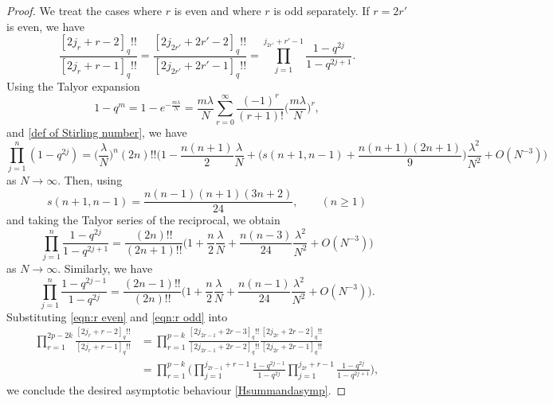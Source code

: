 \documentclass{amsart}
\theoremstyle{plain}
\theoremstyle{remark}
\numberwithin{equation}{section}
\begin{document}
\begin{proof}
   We treat the cases where \( r \) is even and where \( r \) is odd separately.
 If $r=2r'$ is even, we have
    \begin{equation*}
        \frac{[2j_{r}+r-2]_{q}!!}{[2j_{r}+r-1]_{q}!!}
        =\frac{[2j_{2r'}+2r'-2]_{q}!!}{[2j_{2r'}+2r'-1]_{q}!!}
        =\prod_{j=1}^{j_{2r'}+r'-1}\frac{1-q^{2j}}{1-q^{2j+1}}.
    \end{equation*}
    Using the Talyor expansion
    \begin{equation*}
        1-q^{m}=1-e^{-\frac{m\lambda}{N}}=\frac{m\lambda}{N}\sum_{r=0}^{\infty}\frac{(-1)^{r}}{(r+1)!}\Big(\frac{m\lambda}{N}\Big)^{r},
    \end{equation*}
    and \eqref{def of Stirling number}, we have
    \begin{equation*}
        \prod_{j=1}^{n}(1-q^{2j})
        =\Big(\frac{\lambda}{N}\Big)^{n}(2n)!!\bigg(1-\frac{n(n+1)}{2}\frac{\lambda}{N}+\Big(s(n+1,n-1)+\frac{n(n+1)(2n+1)}{9}\Big)\frac{\lambda^{2}}{N^{2}}+O(N^{-3})\bigg)
    \end{equation*}
    as $N\rightarrow\infty$. Then, using  
    \begin{equation*}
        s(n+1,n-1)=\frac{n(n-1)(n+1)(3n+2)}{24}, \qquad (n\geq1)
    \end{equation*} 
    and taking the Talyor series of the reciprocal, we obtain
    \begin{equation}\label{eqn:r even}
        \prod_{j=1}^{n}\frac{1-q^{2j}}{1-q^{2j+1}}
        =\frac{(2n)!!}{(2n+1)!!}\bigg(1+\frac{n}{2}\frac{\lambda}{N}+\frac{n(n-3)}{24}\frac{\lambda^{2}}{N^{2}}+O(N^{-3})\bigg)
    \end{equation}
    as $N\rightarrow\infty$. Similarly, we have 
    \begin{equation}\label{eqn:r odd}
        \prod_{j=1}^{n}\frac{1-q^{2j-1}}{1-q^{2j}}
        =\frac{(2n-1)!!}{(2n)!!}\bigg(1+\frac{n}{2}\frac{\lambda}{N}+\frac{n(n-1)}{24}\frac{\lambda^{2}}{N^{2}}+O(N^{-3})\bigg). 
    \end{equation}
    Substituting \eqref{eqn:r even} and \eqref{eqn:r odd} into
    \begin{align*}
        \prod_{r=1}^{2p-2k}\frac{[2j_{r}+r-2]_{q}!!}{[2j_r+r-1]_{q}!!}
        &=\prod_{r=1}^{p-k}\frac{[2j_{2r-1}+2r-3]_{q}!!}{[2j_{2r-1}+2r-2]_{q}!!}\frac{[2j_{2r}+2r-2]_{q}!!}{[2j_{2r}+2r-1]_{q}!!}\\
        &=\prod_{r=1}^{p-k}\Big(\prod_{j=1}^{j_{2r-1}+r-1}\frac{1-q^{2j-1}}{1-q^{2j}}\prod_{j=1}^{j_{2r}+r-1}\frac{1-q^{2j}}{1-q^{2j+1}}\Big),
    \end{align*}
    we conclude the desired asymptotic behaviour \eqref{Hsummandasymp}.
\end{proof}
\end{document}
